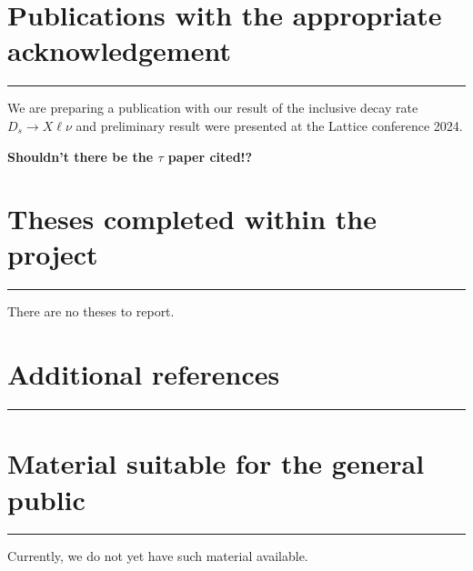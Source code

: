 \documentclass [a4paper, 11pt]{article}
\begin{document}
\section{Publications with the appropriate acknowledgement}
\rule{\textwidth}{0.4pt}

We are preparing a publication with our result of the inclusive decay rate $D_s\to X\ell\nu$ and 
preliminary result were presented at the Lattice conference 2024.

\textbf{Shouldn't there be the $\tau$ paper cited!?}

\begin{thebibliography}{99}



\end{thebibliography}


\section{Theses completed within the project}
\rule{\textwidth}{0.4pt}

There are no theses to report.

\section{Additional references}
\rule{\textwidth}{0.4pt}



\section{Material suitable for the general public}
\rule{\textwidth}{0.4pt}

Currently, we do not yet have such material available.
\end{document}
